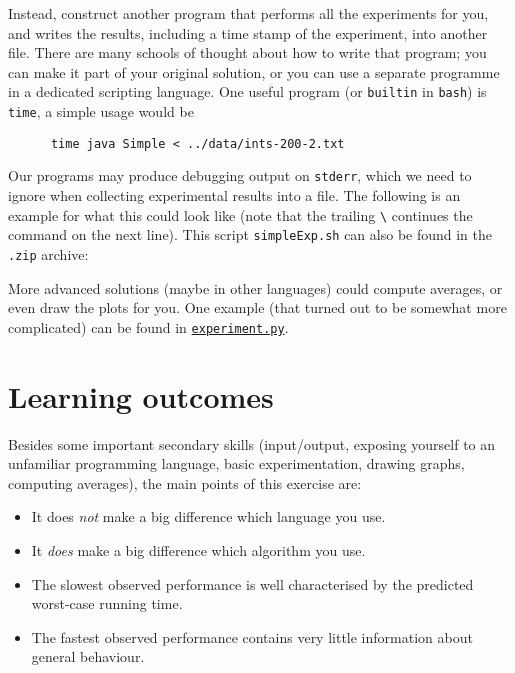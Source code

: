 \documentclass[nobib]{tufte-handout}
\begin{document}
\begin{description}
    Instead, construct another program that performs all the experiments for you, and writes the results, including a time stamp of the experiment, into another file.
    There are many schools of thought about how to write that program; you can make it part of your original solution, or you can use a separate programme in a dedicated scripting language.
    One useful program (or \texttt{builtin} in \texttt{bash}) is \texttt{time}, a simple usage would be 
    \begin{lstlisting}
      time java Simple < ../data/ints-200-2.txt
    \end{lstlisting}
    Our programs may produce debugging output on \texttt{stderr}, which we need to ignore when collecting experimental results into a file. 
    The following is an example for what this could look like (note that the trailing \verb+\+ continues the command on the next line). This script \texttt{simpleExp.sh} can also be found in the \texttt{.zip} archive:
    

    More advanced solutions (maybe in other languages) could compute averages, or even draw the plots for you.
    One example (that turned out to be somewhat more complicated) can be found in \href{https://bitbucket.org/rikj/bads-labs/src/master/foursum/src/simpleExp.sh}{\texttt{experiment.py}}.
\end{description}

\section{Learning outcomes}

Besides some important secondary skills (input/output, exposing yourself to an unfamiliar programming language, basic experimentation, drawing graphs, computing averages), the main points of this exercise are:
\begin{itemize}[nosep]
  \item It does \emph{not} make a big difference which language you use.
  \item It \emph{does} make a big difference which algorithm you use.
  \item The slowest observed performance is well characterised by the predicted worst-case running time.
  \item The fastest observed performance contains very little information about general behaviour.
\end{itemize}
\end{document}
